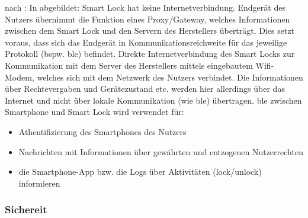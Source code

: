         nach \citeauthor{Ho2016}:
        In  abgebildet: Smart Lock hat keine Internetverbindung. 
        Endgerät des Nutzers übernimmt die Funktion eines Proxy/Gateway, welches Informationen zwischen dem Smart Lock und den Servern des Herstellers überträgt. 
        Dies setzt voraus, dass sich das Endgerät in Kommunikationsreichweite für das jeweilige Protokoll (bspw. \gls{ble}) befindet. 
        Direkte Internetverbindung des Smart Locks zur Kommunikation mit dem Server des Herstellers mittels eingebautem Wifi-Modem, welches sich mit dem Netzwerk des Nutzers verbindet. 
        Die Informationen über Rechtevergaben und Gerätezustand etc. werden hier allerdings über das Internet und nicht über lokale Kommunikation (wie \gls{ble}) übertragen. 
        \gls{ble} zwischen Smartphone und Smart Lock wird verwendet für: 
        \begin{itemize}
            \item Athentifizierung des Smartphones des Nutzers 
            \item Nachrichten mit Informationen über gewährten und entzogenen Nutzerrechten
            \item die Smartphone-App bzw. die Logs über Aktivitäten (lock/unlock) informieren
        \end{itemize}

    \subsubsection{Sichereit}
